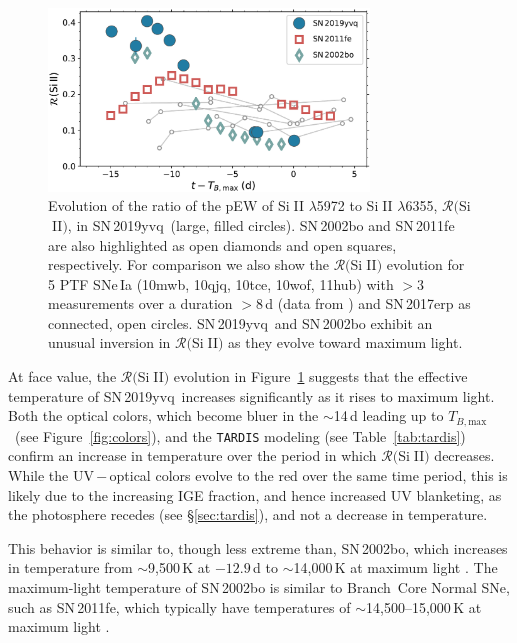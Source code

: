 \documentclass[twocolumn]{aastex63}
\def\ion#1#2{#1$\;${\footnotesize\rm{#2}}\relax}
\newcommand{\tbmax}{$T_{B,\mathrm{max}}$}
\newcommand{\sn}{SN\,2019yvq}
\begin{document}
\begin{figure}
    \centering
    \includegraphics[width=3.35in]{./figures/R_evolution.pdf}
    \caption{Evolution of the ratio of the pEW of \ion{Si}{II} $\lambda$5972
    to \ion{Si}{II} $\lambda$6355, $\mathcal{R}($\ion{Si}{II}$)$, in \sn\
    (large, filled circles). SN\,2002bo \citep[data from][]{Benetti04} and
    SN\,2011fe \citep[data from][]{Pereira13} are also highlighted as open
    diamonds and open squares, respectively. For comparison we also show the
    $\mathcal{R}($\ion{Si}{II}$)$ evolution for 5 PTF SNe\,Ia (10mwb, 10qjq,
    10tce, 10wof, 11hub) with $> 3$ measurements over a duration $> 8$\,d
    (data from \citealt{Maguire14}) and SN\,2017erp \citep[data
    from][]{Brown19} as connected, open circles. \sn\ and SN\,2002bo exhibit
    an unusual inversion in $\mathcal{R}($\ion{Si}{II}$)$ as they evolve
    toward maximum light.}
    \label{fig:r_evo}
\end{figure}

At face value, the $\mathcal{R}($\ion{Si}{II}$)$ evolution in
Figure~\ref{fig:r_evo} suggests that the effective temperature of \sn\
increases significantly as it rises to maximum light. Both the optical colors,
which become bluer in the $\sim$14\,d leading up to \tbmax\ (see
Figure~\ref{fig:colors}), and the \texttt{TARDIS} modeling (see
Table~\ref{tab:tardis}) confirm an increase in temperature over the period in
which $\mathcal{R}($\ion{Si}{II}$)$ decreases. While the UV\,$-$\,optical
colors evolve to the red over the same time period, this is likely due to the
increasing IGE fraction, and hence increased UV blanketing, as the photosphere
recedes (see \S\ref{sec:tardis}), and not a decrease in temperature.

This behavior is similar to, though less extreme than, SN\,2002bo, which
increases in temperature from $\sim$9,500\,K at $-12.9$\,d to $\sim$14,000\,K
at maximum light \citep{Stehle05}. The maximum-light temperature of SN\,2002bo
is similar to Branch~Core Normal SNe, such as SN\,2011fe, which
typically have temperatures of $\sim$14,500--15,000\,K at maximum light
\citep{Mazzali14}.
\end{document}
